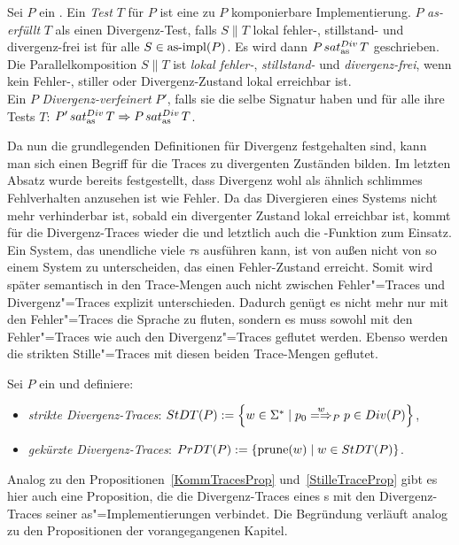 \begin{Def}
  \label{DivTestDef}
  Sei $P$ ein \MEIO{}. Ein \emph{Test} $T$ für $P$ ist eine zu $P$
  komponierbare Implementierung. $P$ \emph{as-erfüllt} $T$ als einen
  Divergenz-Test, falls $S\|T$ lokal fehler-, stillstand- und divergenz-frei
  ist für alle $S\in \mathrm{as}\text{-}\mathrm{impl} (P)$. Es wird dann $P\hspace{0.05cm}sat_\mathrm{as}^{Div}\hspace{0.05cm} T$ geschrieben. Die
  Parallelkomposition $S\|T$ ist \emph{lokal fehler-}, \emph{stillstand-} und
  \emph{divergenz-frei}, wenn kein Fehler-, stiller oder Divergenz-Zustand
  lokal erreichbar ist.\\
  Ein \MEIO{} $P$ \emph{Divergenz-verfeinert} $P'$, falls sie die selbe
  Signatur haben und für alle ihre Tests $T$: $P'\hspace{0.05cm}sat_\mathrm{as}^{Div}\hspace{0.05cm} T \Rightarrow P\hspace{0.05cm}sat_\mathrm{as}^{Div}\hspace{0.05cm}
  T$.
\end{Def}

Da nun die grundlegenden Definitionen für Divergenz festgehalten sind, kann man
sich einen Begriff für die Traces zu divergenten Zuständen bilden. Im letzten
Absatz wurde bereits festgestellt, dass Divergenz wohl als ähnlich \glqq
schlimmes\grqq{} Fehlverhalten anzusehen ist wie Fehler. Da das Divergieren
eines Systems nicht mehr verhinderbar ist, sobald ein divergenter Zustand lokal
erreichbar ist, kommt für die Divergenz-Traces wieder die \prune{} und
letztlich auch die \cont{}-Funktion zum Einsatz. Ein System, das unendliche
viele $\tau$s ausführen kann, ist von außen nicht von so einem System zu
unterscheiden, das einen Fehler-Zustand erreicht. Somit wird später semantisch
in den Trace-Mengen auch nicht zwischen Fehler"=Traces und Divergenz"=Traces
explizit unterschieden. Dadurch genügt es nicht mehr nur mit den Fehler"=Traces
die Sprache zu fluten, sondern es muss sowohl mit den Fehler"=Traces wie auch
den Divergenz"=Traces geflutet werden. Ebenso werden die strikten
Stille"=Traces mit diesen beiden Trace-Mengen geflutet.

\begin{Def}
  Sei $P$ ein \MEIO{} und definiere:
  \begin{itemize}
    \item \emph{strikte Divergenz-Traces}: $\StDT (P) := \left\{w\in\Sigma
      ^*\mid p_0\weakmay[w]_P p\in Div(P)\right\}$,
    \item \emph{gekürzte Divergenz-Traces}: $PrDT (P) := \left\{\mathrm{prune} (w)\mid
      w\in StDT (P)\right\}$.
  \end{itemize}
\end{Def}

Analog zu den Propositionen~\ref{KommTracesProp} und~\ref{StilleTraceProp} gibt
es hier auch eine Proposition, die die Divergenz-Traces eines \MEIO{}s mit den
Divergenz-Traces seiner as"=Implementierungen verbindet. Die Begründung
verläuft analog zu den Propositionen der vorangegangenen Kapitel.

